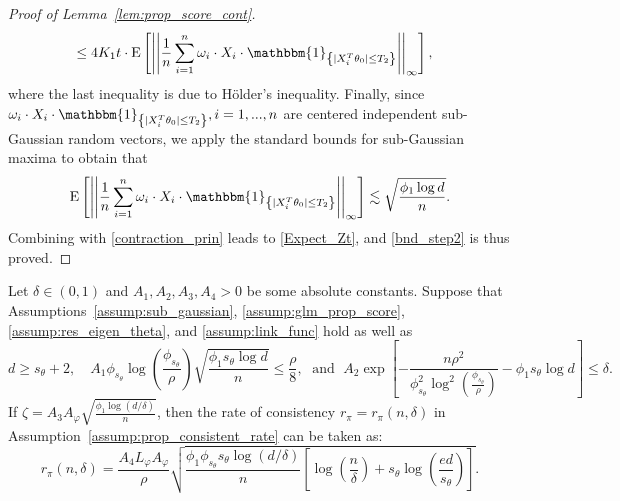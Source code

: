 \documentclass[ejsv2,noshowframe]{imsart}
\theoremstyle{plain}
\theoremstyle{definition}
\theoremstyle{remark}
\newcommand{\norm}[1]{\left|\left| #1 \right|\right|}
\newenvironment{customprop}[1]
{\renewcommand\theinnercustomprop{#1}\innercustomprop}
{\endinnercustomprop}
\begin{document}
\begin{proof}[Proof of Lemma~\ref{lem:prop_score_cont}]
\begin{align}
\begin{split}
			&\leq 4K_1 t \cdot \mathrm{E}\left[\norm{\frac{1}{n} \sum_{i=1}^n \omega_i\cdot X_i \cdot \mathbbm{1}_{\left\{|X_i^T\theta_0| \leq T_2 \right\}}}_{\infty} \right],
		\end{split}
	\end{align}
	where the last inequality is due to H{\"o}lder's inequality. Finally, since $\omega_i \cdot X_i \cdot \mathbbm{1}_{\left\{|X_i^T\theta_0| \leq T_2 \right\}}, i=1,...,n$ are centered independent sub-Gaussian random vectors, we apply the standard bounds for sub-Gaussian maxima to obtain that
	$$\mathrm{E}\left[\norm{\frac{1}{n} \sum_{i=1}^n \omega_i \cdot X_i \cdot \mathbbm{1}_{\left\{|X_i^T\theta_0| \leq T_2 \right\}}}_{\infty} \right] \lesssim \sqrt{\frac{ \phi_1\log d}{n}}.$$
	Combining with \eqref{contraction_prin} leads to \eqref{Expect_Zt}, and \eqref{bnd_step2} is thus proved.
\end{proof}

\vspace{3mm}

\begin{customprop}{C.1}
	Let $\delta \in (0,1)$ and $A_1,A_2,A_3,A_4>0$ be some absolute constants. Suppose that Assumptions~\ref{assump:sub_gaussian}, \ref{assump:glm_prop_score}, \ref{assump:res_eigen_theta}, and \ref{assump:link_func} hold as well as
	$$d \geq s_{\theta} + 2, \quad A_1\phi_{s_{\theta}} \log\left(\frac{\phi_{s_{\theta}}}{\rho}\right) \sqrt{\frac{\phi_1 s_{\theta}\log d}{n}} \leq \frac{\rho}{8}, \; \text{ and }\;   A_2\exp\left[-\frac{n\rho^2}{\phi_{s_{\theta}}^2 \log^2\left(\frac{\phi_{s_{\theta}}}{\rho}\right)} - \phi_1 s_{\theta}\log d\right] \leq \delta.$$
	If $\zeta =A_3 A_{\varphi} \sqrt{\frac{\phi_1\log(d/\delta)}{n}}$, then the rate of consistency $r_{\pi}=r_{\pi}(n,\delta)$ in Assumption~\ref{assump:prop_consistent_rate} can be taken as:
	$$r_{\pi}(n,\delta) = \frac{A_4 L_{\varphi} A_{\varphi}}{\rho} \sqrt{\frac{\phi_1 \phi_{s_{\theta}} s_{\theta} \log(d/\delta)}{n}\left[\log\left(\frac{n}{\delta}\right) + s_{\theta} \log\left(\frac{e d}{s_{\theta}} \right) \right]}.$$
\end{customprop}
\end{document}
